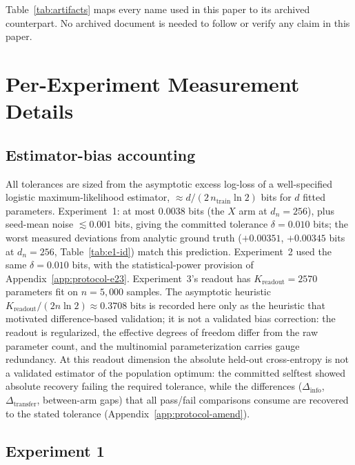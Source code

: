 \documentclass[twocolumn,10pt]{article}
\theoremstyle{definition}
\theoremstyle{remark}
\newcommand{\dn}{d_n}
\begin{document}
Table~\ref{tab:artifacts} maps every name used in this paper to its
archived counterpart. No archived document is needed to follow or
verify any claim in this paper.

\section{Per-Experiment Measurement Details}
\label{app:details}

\subsection{Estimator-bias accounting}
\label{app:details-bias}

All tolerances are sized from the asymptotic excess log-loss of a
well-specified logistic maximum-likelihood estimator,
$\approx d / (2\, n_{\mathrm{train}} \ln 2)$ bits for $d$ fitted
parameters. Experiment~1: at most $0.0038$ bits (the $X$ arm at
$\dn = 256$), plus seed-mean noise $\lesssim 0.001$ bits, giving the
committed tolerance $\delta = 0.010$ bits; the worst measured
deviations from analytic ground truth ($+0.00351$, $+0.00345$ bits at
$\dn = 256$, Table~\ref{tab:e1-id}) match this prediction.
Experiment~2 used the same $\delta = 0.010$ bits, with the
statistical-power provision of Appendix~\ref{app:protocol-e23}.
Experiment~3's readout has $K_{\mathrm{readout}} = 2570$ parameters
fit on $n = 5{,}000$ samples. The asymptotic heuristic
$K_{\mathrm{readout}} / (2 n \ln 2) \approx 0.3708$ bits is recorded
here only as the heuristic that motivated difference-based validation;
it is not a validated bias correction: the readout is regularized,
the effective degrees of freedom differ from the raw parameter count,
and the multinomial parameterization carries gauge redundancy. At this
readout dimension the absolute held-out cross-entropy is not a
validated estimator of the population optimum: the committed selftest
showed absolute recovery failing the required tolerance, while the
differences ($\Delta_{\mathrm{info}}$, $\Delta_{\mathrm{transfer}}$,
between-arm gaps) that all pass/fail comparisons consume are recovered
to the stated tolerance
(Appendix~\ref{app:protocol-amend}).

\subsection{Experiment 1}
\label{app:details-e1}
\end{document}
